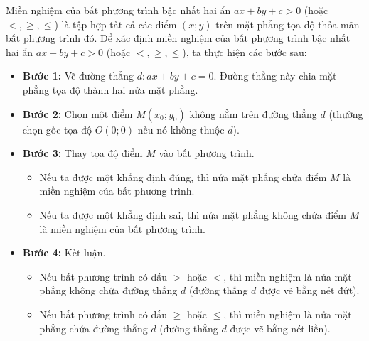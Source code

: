 \begin{kienthuc}
Miền nghiệm của bất phương trình bậc nhất hai ẩn $ax + by + c > 0$ (hoặc $<, \ge, \le$) là tập hợp tất cả các điểm $(x; y)$ trên mặt phẳng tọa độ thỏa mãn bất phương trình đó.
Để xác định miền nghiệm của bất phương trình bậc nhất hai ẩn $ax + by + c > 0$ (hoặc $<, \ge, \le$), ta thực hiện các bước sau:
\begin{itemize}
    \item \textbf{Bước 1:} Vẽ đường thẳng $d: ax + by + c = 0$. Đường thẳng này chia mặt phẳng tọa độ thành hai nửa mặt phẳng.
    \item \textbf{Bước 2:} Chọn một điểm $M(x_0; y_0)$ không nằm trên đường thẳng $d$ (thường chọn gốc tọa độ $O(0; 0)$ nếu nó không thuộc $d$).
    \item \textbf{Bước 3:} Thay tọa độ điểm $M$ vào bất phương trình.
    \begin{itemize}
        \item Nếu ta được một khẳng định đúng, thì nửa mặt phẳng chứa điểm $M$ là miền nghiệm của bất phương trình.
        \item Nếu ta được một khẳng định sai, thì nửa mặt phẳng không chứa điểm $M$ là miền nghiệm của bất phương trình.
    \end{itemize}
    \item \textbf{Bước 4:} Kết luận.
    \begin{itemize}
        \item Nếu bất phương trình có dấu $>$ hoặc $<$, thì miền nghiệm là nửa mặt phẳng không chứa đường thẳng $d$ (đường thẳng $d$ được vẽ bằng nét đứt).
        \item Nếu bất phương trình có dấu $\ge$ hoặc $\le$, thì miền nghiệm là nửa mặt phẳng chứa đường thẳng $d$ (đường thẳng $d$ được vẽ bằng nét liền).
    \end{itemize}
\end{itemize}
\end{kienthuc}

